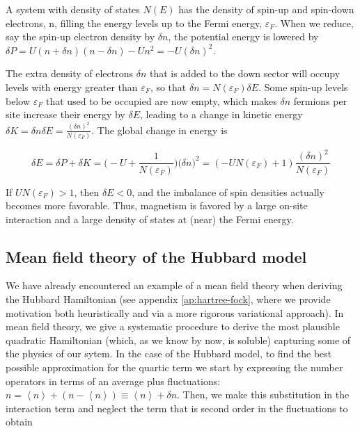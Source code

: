 A system with density of states $N(E)$ has the density of spin-up and spin-down electrons, n, filling the energy levels up to the Fermi energy, $\varepsilon_F$.
When we reduce, say the spin-up electron density by $\delta n$, the potential energy is lowered by $\delta P = U ( n + \delta n ) ( n - \delta n ) - U n^2 = - U (\delta n)^2$.

The extra density of electrons $\delta n$ that is added to the down sector will occupy levels with energy greater than $\varepsilon_F$, so that $\delta n = N ( \varepsilon_F ) \delta E$.
Some spin-up levels below $\varepsilon_F$ that used to be occupied are now empty, which makes $\delta n$ fermions per site increase their energy by $\delta E$, leading to a change in kinetic energy $\delta K = \delta n \delta E = \frac{(\delta n)^2}{N(\varepsilon_F)}$.
The global change in energy is

\begin{equation}
\delta E = \delta P + \delta K = \bigg( - U + \frac{1}{N(\varepsilon_F)} \bigg) \big( \delta n \big)^2 = ( - U N ( \varepsilon_F ) + 1) \frac{(\delta n)^2}{N(\varepsilon_F)}
\end{equation}

If $U N ( \varepsilon_F ) > 1$, then $\delta E < 0$, and the imbalance of spin densities actually becomes more favorable.
Thus, magnetism is favored by a large on-site interaction and a large density of states at (near) the Fermi energy.

\subsection{Mean field theory of the Hubbard model}

We have already encountered an example of a mean field theory when deriving the Hubbard Hamiltonian (see appendix \ref{ap:hartree-fock}, where we provide motivation both heuristically and via a more rigorous variational approach).
In mean field theory, we give a systematic procedure to derive the most plausible quadratic Hamiltonian (which, as we know by now, is soluble) capturing some of the physics of our sytem.
In the case of the Hubbard model, to find the best possible approximation for the quartic term we start by expressing the number operators in terms of an average plus fluctuations: $n = \left\langle n \right\rangle + ( n - \left\langle n \right\rangle ) \equiv \left\langle n \right\rangle + \delta n$.
Then, we make this substitution in the interaction term and neglect the term that is second order in the fluctuations to obtain

